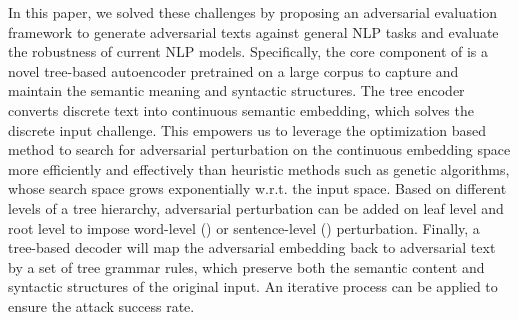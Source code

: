 In this paper, we solved these challenges by proposing an adversarial
evaluation framework \advcodec to generate adversarial texts against general NLP tasks and evaluate the robustness of current NLP models. 
Specifically, the core component of \advcodec is a novel tree-based autoencoder pretrained on a large corpus to capture and maintain the semantic meaning and syntactic structures.
The tree encoder converts discrete text into continuous semantic embedding, which solves the discrete input challenge. 
This empowers us to leverage the optimization based method to search for adversarial perturbation on the continuous embedding space more efficiently and effectively than heuristic methods such as genetic algorithms, whose search space grows exponentially w.r.t. the input space. 
Based on different levels of a tree hierarchy, adversarial perturbation can be added on leaf level and root level to impose word-level (\advcodecword) or sentence-level (\advcodecsent) perturbation.
Finally, a tree-based decoder will map the adversarial embedding back to adversarial text by a set of tree grammar rules, which preserve both the semantic content and syntactic structures of the original input. An iterative process can be applied to ensure the attack success rate. 

